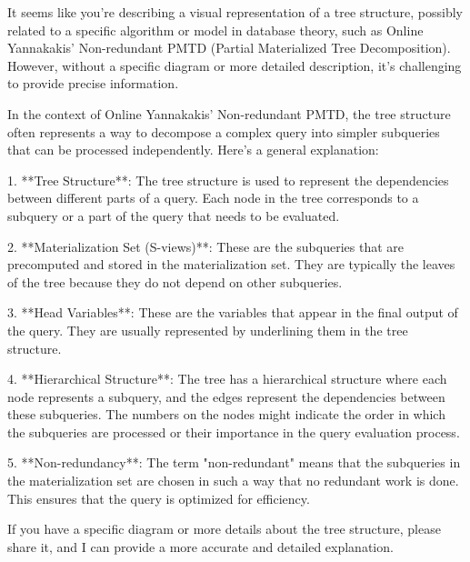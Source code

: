 It seems like you're describing a visual representation of a tree structure, possibly related to a specific algorithm or model in database theory, such as Online Yannakakis' Non-redundant PMTD (Partial Materialized Tree Decomposition). However, without a specific diagram or more detailed description, it's challenging to provide precise information.

In the context of Online Yannakakis' Non-redundant PMTD, the tree structure often represents a way to decompose a complex query into simpler subqueries that can be processed independently. Here’s a general explanation:

1. **Tree Structure**: The tree structure is used to represent the dependencies between different parts of a query. Each node in the tree corresponds to a subquery or a part of the query that needs to be evaluated.

2. **Materialization Set (S-views)**: These are the subqueries that are precomputed and stored in the materialization set. They are typically the leaves of the tree because they do not depend on other subqueries.

3. **Head Variables**: These are the variables that appear in the final output of the query. They are usually represented by underlining them in the tree structure.

4. **Hierarchical Structure**: The tree has a hierarchical structure where each node represents a subquery, and the edges represent the dependencies between these subqueries. The numbers on the nodes might indicate the order in which the subqueries are processed or their importance in the query evaluation process.

5. **Non-redundancy**: The term "non-redundant" means that the subqueries in the materialization set are chosen in such a way that no redundant work is done. This ensures that the query is optimized for efficiency.

If you have a specific diagram or more details about the tree structure, please share it, and I can provide a more accurate and detailed explanation.
